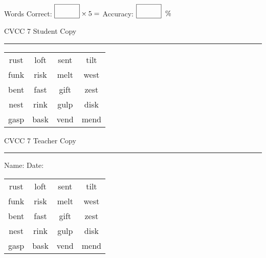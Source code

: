 \documentclass{memoir}
\begin{document}
\small

Words Correct: $\fbox{\phantom{\huge 100}} \times 5 = $ Accuracy: $\fbox{\phantom{\huge 100}}\;\; \%$ 

\vfill

\newpage


\footnotesize \noindent
CVCC 7 \hfill Student Copy
\smallskip
\hrule

\Large

\setlength{\tabcolsep}{14pt}
\def\arraystretch{3}

{\selectfont


\begin{vplace}[0.5]
\begin{center}
\begin{tabular}{cccc}
rust & loft & sent & tilt \\
funk & risk & melt & west \\
bent & fast & gift & zest \\
nest & rink & gulp & disk \\
gasp & bask & vend & mend \\
\end{tabular}
\end{center}
\end{vplace}

}

\newpage

\footnotesize \noindent
CVCC 7 \hfill Teacher Copy
\smallskip
\hrule

\small

\vfill

\noindent
Name: \underline{\hspace{1.75in}} \hfill Date: \underline{\hspace{1in}}

\Large

{\selectfont


\begin{vplace}[0.5]
\begin{center}
\begin{tabular}{cccc}
rust & loft & sent & tilt \\
funk & risk & melt & west \\
bent & fast & gift & zest \\
nest & rink & gulp & disk \\
gasp & bask & vend & mend \\
\end{tabular}
\end{center}
\end{vplace}



}
\end{document}
